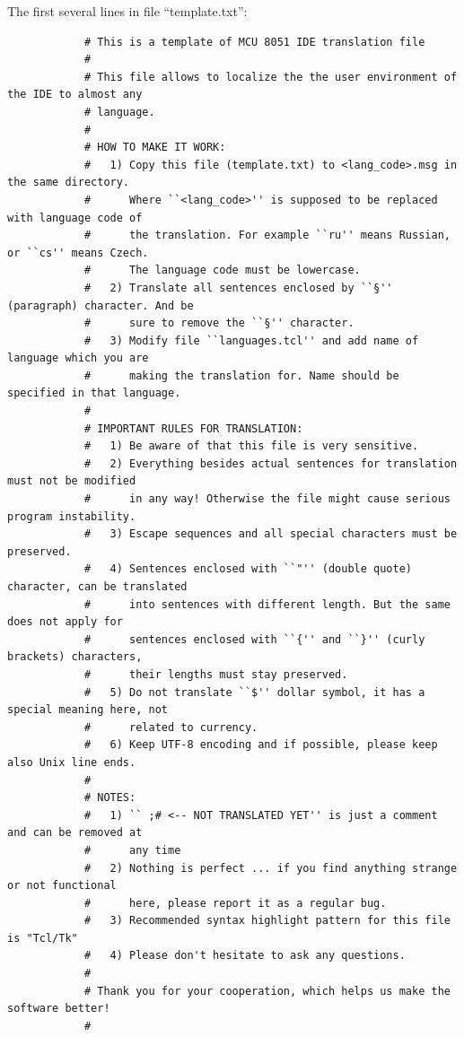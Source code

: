 \documentclass[a4paper,twoside,12pt]{book}
\newcommand{\mysmallfont}{\fontsize{8pt}{10pt} \selectfont{}}
\begin{document}
	\bigskip
	\noindent
	{
		The first several lines in file ``template.txt'':\\
		\mysmallfont{}
		\begin{verbatim}
			# This is a template of MCU 8051 IDE translation file
			#
			# This file allows to localize the the user environment of the IDE to almost any
			# language.
			#
			# HOW TO MAKE IT WORK:
			#   1) Copy this file (template.txt) to <lang_code>.msg in the same directory.
			#      Where ``<lang_code>'' is supposed to be replaced with language code of
			#      the translation. For example ``ru'' means Russian, or ``cs'' means Czech.
			#      The language code must be lowercase.
			#   2) Translate all sentences enclosed by ``§'' (paragraph) character. And be
			#      sure to remove the ``§'' character.
			#   3) Modify file ``languages.tcl'' and add name of language which you are
			#      making the translation for. Name should be specified in that language.
			#
			# IMPORTANT RULES FOR TRANSLATION:
			#   1) Be aware of that this file is very sensitive.
			#   2) Everything besides actual sentences for translation must not be modified
			#      in any way! Otherwise the file might cause serious program instability.
			#   3) Escape sequences and all special characters must be preserved.
			#   4) Sentences enclosed with ``"'' (double quote) character, can be translated
			#      into sentences with different length. But the same does not apply for
			#      sentences enclosed with ``{'' and ``}'' (curly brackets) characters,
			#      their lengths must stay preserved.
			#   5) Do not translate ``$'' dollar symbol, it has a special meaning here, not
			#      related to currency.
			#   6) Keep UTF-8 encoding and if possible, please keep also Unix line ends.
			#
			# NOTES:
			#   1) `` ;# <-- NOT TRANSLATED YET'' is just a comment and can be removed at
			#      any time
			#   2) Nothing is perfect ... if you find anything strange or not functional
			#      here, please report it as a regular bug.
			#   3) Recommended syntax highlight pattern for this file is "Tcl/Tk"
			#   4) Please don't hesitate to ask any questions.
			#
			# Thank you for your cooperation, which helps us make the software better!
			#
		\end{verbatim}
	}
\end{document}
